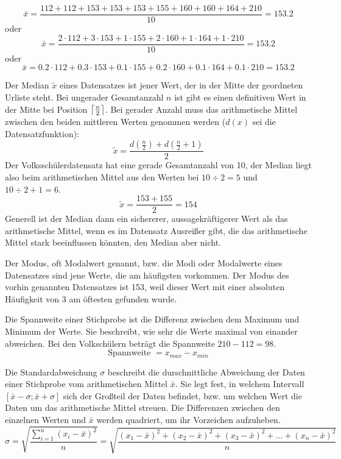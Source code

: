 $$\bar{x} = \frac{112 + 112 + 153 + 153 + 153 + 155 + 160 + 160 + 164 + 210}{10} = 153.2$$ oder $$\bar{x} = \frac{2 \cdot 112 + 3 \cdot 153 + 1 \cdot 155 + 2 \cdot 160 + 1 \cdot 164 + 1 \cdot 210}{10} = 153.2$$ oder $$\bar{x} = 0.2 \cdot 112 + 0.3 \cdot 153 + 0.1 \cdot 155 + 0.2 \cdot 160 + 0.1 \cdot 164 + 0.1 \cdot 210 = 153.2$$


Der Median $\tilde{x}$ eines Datensatzes ist jener Wert, der in der Mitte der geordneten Urliste steht. Bei ungerader Gesamtanzahl $n$ ist gibt es einen definitiven Wert in der Mitte bei Position $\left\lceil \frac{n}{2} \right\rceil$. Bei gerader Anzahl muss das arithmetische Mittel zwischen den beiden mittleren Werten genommen werden ($d(x)$ sei die Datensatzfunktion): $$\tilde{x} = \frac{d(\frac{n}{2}) + d(\frac{n}{2} + 1)}{2}$$ Der Volkssch\"{u}lerdatensatz hat eine gerade Gesamtanzahl von 10, der Median liegt also beim arithmetischen Mittel aus den Werten bei $10 \div 2 = 5$ und $10 \div 2 + 1 = 6$. $$\tilde{x} = \frac{153 + 155}{2} = 154$$ Generell ist der Median dann ein sichererer, aussagekr\"{a}ftigerer Wert als das arithmetische Mittel, wenn es im Datensatz Ausrei\ss{}er gibt, die das arithmetische Mittel stark beeinflussen k\"{o}nnten, den Median aber nicht.

\pagebreak


Der Modus, oft Modalwert genannt, bzw. die Modi oder Modalwerte eines Datensatzes sind jene Werte, die am h\"{a}ufigsten vorkommen. Der Modus des vorhin genannten Datensatzes ist 153, weil dieser Wert mit einer absoluten H\"{a}ufigkeit von 3 am \"{o}ftesten gefunden wurde.



Die Spannweite einer Stichprobe ist die Differenz zwischen dem Maximum und Minimum der Werte. Sie beschreibt, wie sehr die Werte maximal von einander abweichen. Bei den Volksch\"{u}lern betr\"{a}gt die Spannweite $210 - 112 = 98$. $$\text{Spannweite } = x_{max} - x_{min}$$


Die Standardabweichung $\sigma$ beschreibt die durschnittliche Abweichung der Daten einer Stichprobe vom arithmetischen Mittel $\bar{x}$. Sie legt fest, in welchem Intervall $[\bar{x} - \sigma ; \bar{x} + \sigma]$ sich der Gro\ss{}teil der Daten befindet, bzw. um welchen Wert die Daten um das arithmetische Mittel streuen. Die Differenzen zwischen den einzelnen Werten und $\bar{x}$ werden quadriert, um ihr Vorzeichen aufzuheben. $$\sigma = \sqrt{\frac{\sum_{i=1}^{n} (x_{i} - \bar{x})^2}{n}} = \sqrt{\frac{(x_{1} - \bar{x})^2 + (x_{2} - \bar{x})^2 + (x_{3} - \bar{x})^2 + ... + (x_{n} - \bar{x})^2}{n}}$$

